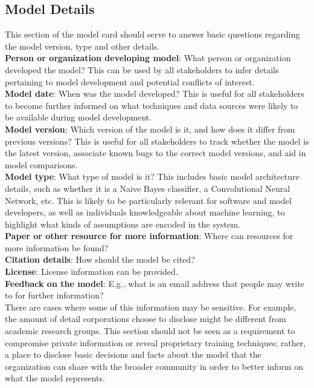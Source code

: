 \subsection{Model Details}
This section of the model card should serve to answer basic questions regarding the model version, type and other details.  \\
{\bf Person or organization developing model}:  What person or organization developed the model? This can be used by all stakeholders to infer details pertaining to model development and potential conflicts of interest. \\
{\bf Model date}:  When was the model developed?  This is useful for all stakeholders to become further informed on what techniques and data sources were likely to be available during model development. \\
{\bf Model version}:  Which version of the model is it, and how does it differ from previous versions?  This is useful for all stakeholders to track whether the model is the latest version, associate known bugs to the correct model versions, and aid in model comparisons. \\
{\bf Model type}:   What type of model is it?  This includes basic model architecture details, such as whether it is a  Naive Bayes classifier, a Convolutional Neural Network, etc.  This is likely to be particularly relevant for software and model developers, as well as individuals knowledgeable about machine learning, to highlight what kinds of assumptions are encoded in the system.\\
{\bf Paper or other resource for more information}: Where can resources for more information be found?  \\
{\bf Citation details}: How should the model be cited? \\
{\bf License}: License information can be provided.  \\
{\bf Feedback on the model}:  E.g., what is an email address that people may write to for further information? \\

There are cases where some of this information may be sensitive. For example, the amount of detail corporations choose to disclose might be different from academic research groups. This section should not be seen as a requirement to compromise private information or reveal proprietary training techniques; rather, a place to disclose basic decisions and facts about the model that the organization can share with the broader community in order to better inform on what the model represents.

